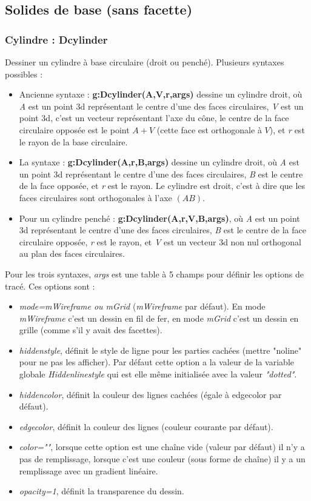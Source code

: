 \subsection{Solides de base (sans facette)}

\subsubsection{Cylindre : Dcylinder}

Dessiner un cylindre à base circulaire (droit ou penché). Plusieurs syntaxes possibles :
\begin{itemize}
    \item Ancienne syntaxe : \textbf{g:Dcylinder(A,V,r,args)} dessine un cylindre droit, où \emph{A} est un point 3d représentant le centre d'une des faces circulaires, \emph{V} est un point 3d, c'est un vecteur représentant l'axe du cône, le centre de la face circulaire opposée est le point $A+V$ (cette face est orthogonale à $V$), et \emph{r} est le rayon de la base circulaire.
    \item La syntaxe : \textbf{g:Dcylinder(A,r,B,args)} dessine un cylindre droit, où \emph{A} est un point 3d représentant le centre d'une des faces circulaires, \emph{B} est le centre de la face opposée, et \emph{r} est le rayon. Le cylindre est droit, c'est à dire que les faces circulaires sont orthogonales à l'axe $(AB)$.
    \item Pour un cylindre penché :  \textbf{g:Dcylinder(A,r,V,B,args)}, où \emph{A} est un point 3d représentant le centre d'une des faces circulaires, \emph{B} est le centre de la face circulaire opposée, \emph{r} est le rayon, et \emph{V} est un vecteur 3d non nul orthogonal au plan des faces circulaires.
\end{itemize}
Pour les trois syntaxes, \emph{args} est une table à 5 champs pour définir les options de tracé. Ces options sont :
       \begin{itemize}
            \item \emph{mode=mWireframe ou mGrid} (\emph{mWireframe} par défaut). En mode \emph{mWireframe} c'est un dessin en fil de fer, en mode \emph{mGrid} c'est un dessin en grille (comme s'il y avait des facettes).
            \item \emph{hiddenstyle}, définit le style de ligne pour les parties cachées (mettre "noline" pour ne pas les afficher). Par défaut cette option a la valeur de la variable globale \emph{Hiddenlinestyle} qui est elle même initialisée avec la valeur \emph{"dotted"}.
            \item \emph{hiddencolor}, définit la couleur des lignes cachées (égale à edgecolor par défaut).
            \item \emph{edgecolor}, définit la couleur des lignes (couleur courante par défaut).
            \item \emph{color=""}, lorsque cette option est une chaîne vide (valeur par défaut) il n'y a pas de remplissage,  lorsque c'est une couleur (sous forme de chaîne) il y a un remplissage avec un gradient linéaire.
            \item \emph{opacity=1}, définit la transparence du dessin.
        \end{itemize}

